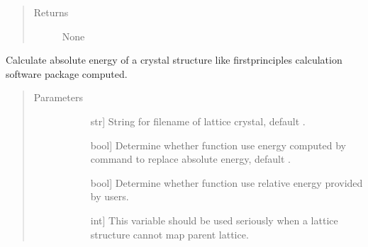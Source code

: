 \documentclass[letterpaper,10pt,english]{sphinxmanual}
\begin{document}
\begin{fulllineitems}
\begin{fulllineitems}
\begin{quote}
\begin{description}
\begin{description}
\end{description}

\item[{Returns}] \leavevmode\begin{description}
\item[{None}] \leavevmode
\end{description}

\end{description}\end{quote}

\end{fulllineitems}


\begin{fulllineitems}
\label{\detokenize{pygace:pygace.ce.CE.get_total_energy}}
\sphinxAtStartPar
Calculate absolute energy of a crystal structure like first\sphinxhyphen{}principles
calculation software package computed.
\begin{quote}\begin{description}
\item[{Parameters}] \leavevmode\begin{description}
\item[{}] \leavevmode{[}str{]}
\sphinxAtStartPar
String for filename of lattice crystal, default .

\item[{}] \leavevmode{[}bool{]}
\sphinxAtStartPar
Determine whether function use energy computed by 
command to replace absolute energy, default .

\item[{}] \leavevmode{[}bool{]}
\sphinxAtStartPar
Determine whether function use relative energy provided by users.

\item[{}] \leavevmode{[}int{]}
\sphinxAtStartPar
This variable should be used seriously when a lattice structure
cannot map parent lattice.


\end{description}
\end{description}
\end{quote}
\end{fulllineitems}
\end{fulllineitems}
\end{document}
